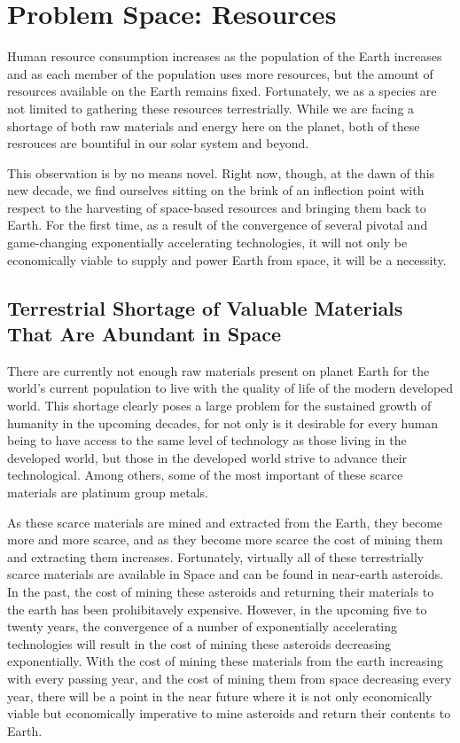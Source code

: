 \documentclass[english]{article}
\begin{document}
\section{Problem Space: Resources}

Human resource consumption increases as the population of the Earth
increases and as each member of the population uses more resources,
but the amount of resources available on the Earth remains fixed.
Fortunately, we as a species are not limited to gathering these resources
terrestrially. While we are facing a shortage of both raw materials\cite{gordon}
and energy here on the planet, both of these resrouces are bountiful
in our solar system and beyond.

This observation is by no means novel. Right now, though, at the dawn
of this new decade, we find ourselves sitting on the brink of an inflection
point with respect to the harvesting of space-based resources and
bringing them back to Earth. For the first time, as a result of the
convergence of several pivotal and game-changing exponentially accelerating
technologies, it will not only be economically viable to supply and
power Earth from space, it will be a necessity.


\subsection{Terrestrial Shortage of Valuable Materials That Are Abundant in Space}

There are currently not enough raw materials present on planet Earth
for the world's current population to live with the quality of life
of the modern developed world\cite{gordon}. This shortage clearly
poses a large problem for the sustained growth of humanity in the
upcoming decades, for not only is it desirable for every human being
to have access to the same level of technology as those living in
the developed world, but those in the developed world strive to advance
their technological. Among others, some of the most important of these
scarce materials are platinum group metals\cite{gerlach}.

As these scarce materials are mined and extracted from the Earth,
they become more and more scarce, and as they become more scarce the
cost of mining them and extracting them increases. Fortunately, virtually
all of these terrestrially scarce materials are available in Space
and can be found in near-earth asteroids. In the past, the cost of
mining these asteroids and returning their materials to the earth
has been prohibitavely expensive. However, in the upcoming five to
twenty years, the convergence of a number of exponentially accelerating
technologies will result in the cost of mining these asteroids decreasing
exponentially. With the cost of mining these materials from the earth
increasing with every passing year, and the cost of mining them from
space decreasing every year, there will be a point in the near future
where it is not only economically viable but economically imperative
to mine asteroids and return their contents to Earth\cite{gerlach}.
\end{document}
